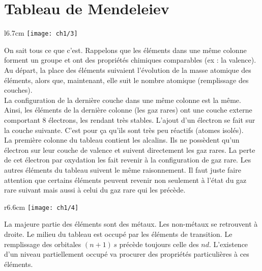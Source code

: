 \section{Tableau de Mendeleiev}
\begin{wrapfigure}[11]{l}{6.7cm}
	\vspace{-5mm}
	\texttt{[image: ch1/3]}
\end{wrapfigure}
On sait tous ce que c'est. Rappelons que les éléments dans une même colonne forment un groupe et ont des propriétés chimiques comparables (ex : la valence). Au départ, la place des éléments suivaient l'évolution de la masse atomique des éléments, alors que, maintenant, elle suit le nombre atomique (remplissage des couches).\\
La configuration de la dernière couche dans une même colonne est la même. Ainsi, les éléments de la dernière colonne (les gaz rares) ont une couche externe comportant 8 électrons, les rendant très stables. L'ajout d'un électron se fait sur la couche suivante. C'est pour ça qu'ils sont très peu réactifs (atomes isolés). \\
La première colonne du tableau contient les alcalins. Ils ne possèdent qu'un électron sur leur couche de valence et suivent directement les gaz rares. La perte de cet électron par oxydation les fait revenir à la configuration de gaz rare. Les autres éléments du tableau suivent le même raisonnement. Il faut juste faire attention que certains éléments peuvent revenir non seulement à l'état du gaz rare suivant mais aussi à celui du gaz rare qui les précède. \\
	
\begin{wrapfigure}[9]{r}{6.6cm}
	\vspace{-5mm}
	\texttt{[image: ch1/4]}
\end{wrapfigure}
La majeure partie des éléments sont des métaux. Les non-métaux se retrouvent à droite. Le milieu du tableau est occupé par les éléments de transition. Le remplissage des orbitales $(n+1) \, s$ précède toujours celle des $nd$. L'existence d'un niveau partiellement occupé va procurer des propriétés particulières à ces éléments.
	
	
	
	